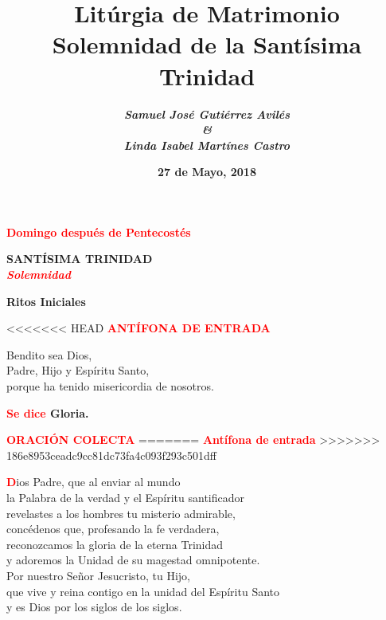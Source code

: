 \documentclass[12pt, letterpaper, spanish]{report}
\begin{document}
\title{
	\Huge \bfseries Lit\'urgia de Matrimonio \\
	\large Solemnidad de la Sant\'isima Trinidad
}
\author{
	\Large \em \bfseries Samuel Jos\'e Guti\'errez Avil\'es \\ 
	\Large \em \bfseries \& \\ 
	\Large \em \bfseries Linda Isabel Mart\'ines Castro
}
\date{\bfseries 27 de Mayo, 2018}

\maketitle

\begin{center} 
\Large {\bfseries \textcolor{red}{Domingo despu\'es de Pentecost\'es}}
\end{center}

\begin{center}
\Huge {\bfseries SANT\'ISIMA TRINIDAD} \\
\Large {\bfseries \em \textcolor{red}{Solemnidad}}
\end{center}

\vspace{1cm}

\begin{center} 
\Huge {\bfseries Ritos Iniciales}
\end{center}

<<<<<<< HEAD
\Large {\bfseries \textcolor{red}{ANT\'IFONA DE ENTRADA}} \newline

\Large Bendito sea Dios,\\
Padre, Hijo y Esp\'iritu Santo,\\
porque ha tenido misericordia de nosotros. \newline

\Large {\bfseries \textcolor{red}{Se dice} Gloria.} \newline

\Large {\bfseries \textcolor{red}{ORACI\'ON COLECTA}} \newline
=======
\huge {\bfseries \textcolor{red}{Ant\'ifona de entrada}} \newline
>>>>>>> 186e8953ceadc9cc81dc73fa4c093f293c501dff

\Large \lettrine{\bfseries \textcolor{red}{D}}{}ios Padre, que al enviar al mundo \\ 
la Palabra de la verdad y el Esp\'iritu santificador \\ 
revelastes a los hombres tu misterio admirable, \\
conc\'edenos que, profesando la fe verdadera, \\
reconozcamos la gloria de la eterna Trinidad \\
y adoremos la Unidad de su magestad omnipotente. \\
Por nuestro Se\~nor Jesucristo, tu Hijo, \\
que vive y reina contigo en la unidad del Esp\'iritu Santo \\
y es Dios por los siglos de los siglos. \newline
\end{document}
